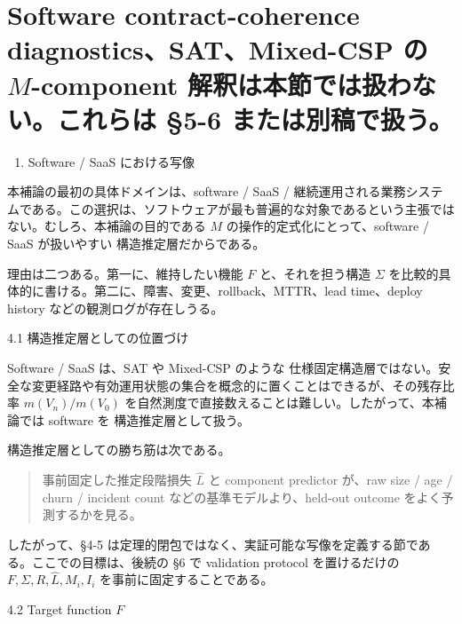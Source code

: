\documentclass[12pt,a4paper]{article}
\begin{document}
\section{\texorpdfstring{Software contract-coherence diagnostics、SAT、Mixed-CSP の \(M\)-component 解釈は本節では扱わない。これらは §5-6 または別稿で扱う。}{Software contract-coherence diagnostics、SAT、Mixed-CSP の M-component 解釈は本節では扱わない。これらは §5-6 または別稿で扱う。}}\label{software-contract-coherence-diagnosticssatmixed-csp-ux306e-m-component-ux89e3ux91c8ux306fux672cux7bc0ux3067ux306fux6271ux308fux306aux3044ux3053ux308cux3089ux306f-5-6-ux307eux305fux306fux5225ux7a3fux3067ux6271ux3046}

\begin{enumerate}
\def\labelenumi{\arabic{enumi}.}
\setcounter{enumi}{3}
\tightlist
\item
  Software / SaaS における写像
\end{enumerate}

本補論の最初の具体ドメインは、software / SaaS / 継続運用される業務システムである。この選択は、ソフトウェアが最も普遍的な対象であるという主張ではない。むしろ、本補論の目的である \(M\) の操作的定式化にとって、software / SaaS が扱いやすい 構造推定層だからである。

理由は二つある。第一に、維持したい機能 \(F\) と、それを担う構造 \(\Sigma\) を比較的具体的に書ける。第二に、障害、変更、rollback、MTTR、lead time、deploy history などの観測ログが存在しうる。

4.1 構造推定層としての位置づけ

Software / SaaS は、SAT や Mixed-CSP のような 仕様固定構造層ではない。安全な変更経路や有効運用状態の集合を概念的に置くことはできるが、その残存比率 \(m(V_n)/m(V_0)\) を自然測度で直接数えることは難しい。したがって、本補論では software を 構造推定層として扱う。

構造推定層としての勝ち筋は次である。

\begin{quote}
事前固定した推定段階損失 $\hat L$ と component predictor が、raw size / age / churn / incident count などの基準モデルより、held-out outcome をよく予測するかを見る。
\end{quote}

したがって、§4-5 は定理的閉包ではなく、実証可能な写像を定義する節である。ここでの目標は、後続の §6 で validation protocol を置けるだけの \(F,\Sigma,R,\hat L,M_i,I_i\) を事前に固定することである。

4.2 Target function \(F\)
\end{document}
